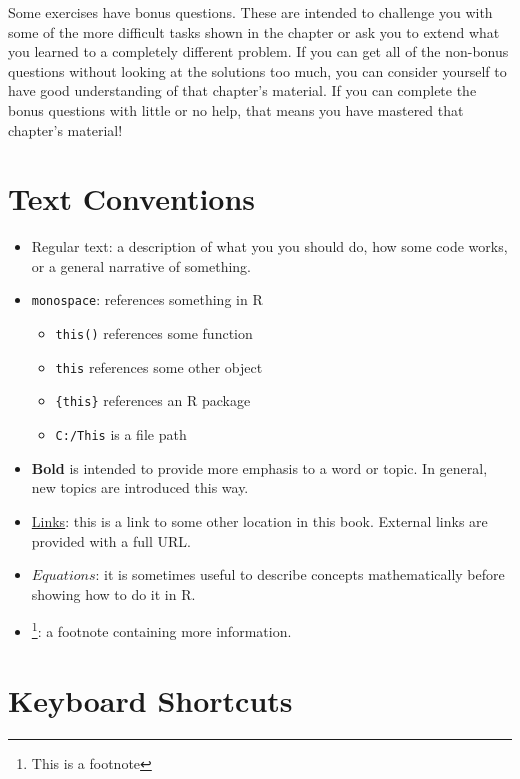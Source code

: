 \documentclass[]{book}
\providecommand{\tightlist}{%
  \setlength{\itemsep}{0pt}\setlength{\parskip}{0pt}}
\let\rmarkdownfootnote\footnote%
\def\footnote{\protect\rmarkdownfootnote}
\theoremstyle{definition}
\theoremstyle{definition}
\theoremstyle{definition}
\theoremstyle{remark}
\begin{document}
Some exercises have bonus questions. These are intended to challenge you
with some of the more difficult tasks shown in the chapter or ask you to
extend what you learned to a completely different problem. If you can
get all of the non-bonus questions without looking at the solutions too
much, you can consider yourself to have good understanding of that
chapter's material. If you can complete the bonus questions with little
or no help, that means you have mastered that chapter's material!

\hypertarget{notation}{\section*{Text Conventions}\label{notation}}

\begin{itemize}
\tightlist
\item
  Regular text: a description of what you you should do, how some code
  works, or a general narrative of something.
\item
  \texttt{monospace}: references something in R

  \begin{itemize}
  \tightlist
  \item
    \texttt{this()} references some function
  \item
    \texttt{this} references some other object
  \item
    \texttt{\{this\}} references an R package
  \item
    \texttt{C:/This} is a file path
  \end{itemize}
\item
  \textbf{Bold} is intended to provide more emphasis to a word or topic.
  In general, new topics are introduced this way.
\item
  \protect\hyperlink{notation}{Links}: this is a link to some other
  location in this book. External links are provided with a full URL.
\item
  \(Equations\): it is sometimes useful to describe concepts
  mathematically before showing how to do it in R.
\item
  \footnote{This is a footnote}: a footnote containing more information.
\end{itemize}

\section*{Keyboard Shortcuts}\label{keyboard-shortcuts}
\end{document}
